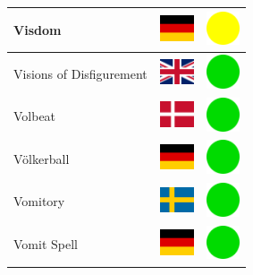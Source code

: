 \documentclass[12pt, a4paper, twoside]{report}
\begin{document}
\begin{center}
\begin{longtable}{|p{5cm}|p{2cm}|p{2cm}|}
 Visdom                                                     & \includegraphics[width=1cm]{../4x3/de} &   \includegraphics[width=1cm]{../likes/m} \\ \hline
 Visions of Disfigurement                                   & \includegraphics[width=1cm]{../4x3/gb} &   \includegraphics[width=1cm]{../likes/y} \\ \hline
 Volbeat                                                    & \includegraphics[width=1cm]{../4x3/dk} &   \includegraphics[width=1cm]{../likes/y} \\ \hline
 Völkerball                                                 & \includegraphics[width=1cm]{../4x3/de} &   \includegraphics[width=1cm]{../likes/y} \\ \hline
 Vomitory                                                   & \includegraphics[width=1cm]{../4x3/se} &   \includegraphics[width=1cm]{../likes/y} \\ \hline
 Vomit Spell                                                & \includegraphics[width=1cm]{../4x3/de} &   \includegraphics[width=1cm]{../likes/y} \\ \hline

\end{longtable}
\end{center}
\end{document}
